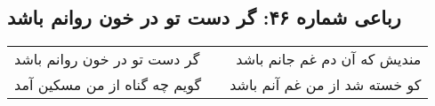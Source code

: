 \begin{center}
\section*{رباعی شماره ۴۶: گر دست تو در خون روانم باشد}
\label{sec:046}
\begin{longtable}{l p{0.5cm} r}
گر دست تو در خون روانم باشد
&&
مندیش که آن دم غم جانم باشد
\\
گویم چه گناه از من مسکین آمد
&&
کو خسته شد از من غم آنم باشد
\\
\end{longtable}
\end{center}

